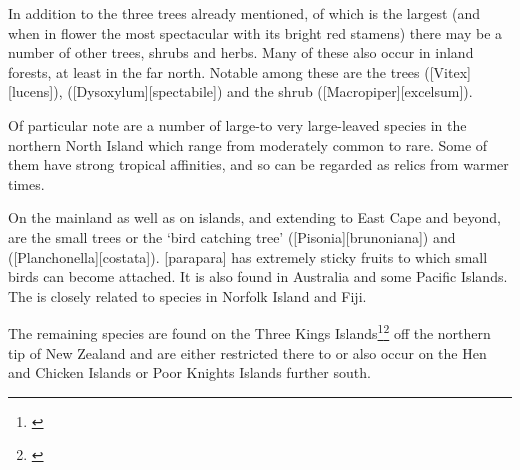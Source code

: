 In addition to the three trees already mentioned, of which  is the largest (and when in flower the most spectacular with its bright red stamens) there may be a number of other trees, shrubs and herbs.
Many of these also occur in inland forests, at least in the far north.
Notable among these are the trees  ([Vitex][lucens]),  ([Dysoxylum][spectabile]) and the shrub  ([Macropiper][excelsum]).

Of particular note are a number of large-to very large-leaved species in the northern North Island which range from moderately common to rare.
Some of them have strong tropical affinities, and so can be regarded as relics from warmer times.

On the mainland as well as on islands, and extending to East Cape and beyond, are the small trees  or the `bird catching tree' ([Pisonia][brunoniana]) and  ([Planchonella][costata]).
[parapara] has extremely sticky fruits to which small birds can become attached.
It is also found in Australia and some Pacific Islands.
The  is closely related to species in Norfolk Island and Fiji.

The remaining species are found on the Three Kings Islands\footnote{\cite{baylis1948vegetation}}\footnote{\cite{oliver1948flora}} off the northern tip of New Zealand and are either restricted there to or also occur on the Hen and Chicken Islands or Poor Knights Islands further south.


